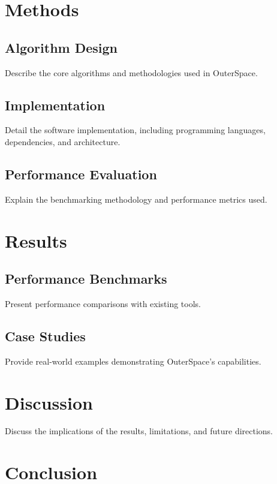 \documentclass[9pt,twocolumn,twoside]{extarticle}
\begin{document}
\section{Methods}

\subsection{Algorithm Design}

Describe the core algorithms and methodologies used in OuterSpace.

\subsection{Implementation}

Detail the software implementation, including programming languages, dependencies, and architecture.

\subsection{Performance Evaluation}

Explain the benchmarking methodology and performance metrics used.

\section{Results}

\subsection{Performance Benchmarks}

Present performance comparisons with existing tools.

\subsection{Case Studies}

Provide real-world examples demonstrating OuterSpace's capabilities.

\section{Discussion}

Discuss the implications of the results, limitations, and future directions.

\section{Conclusion}
\end{document}
